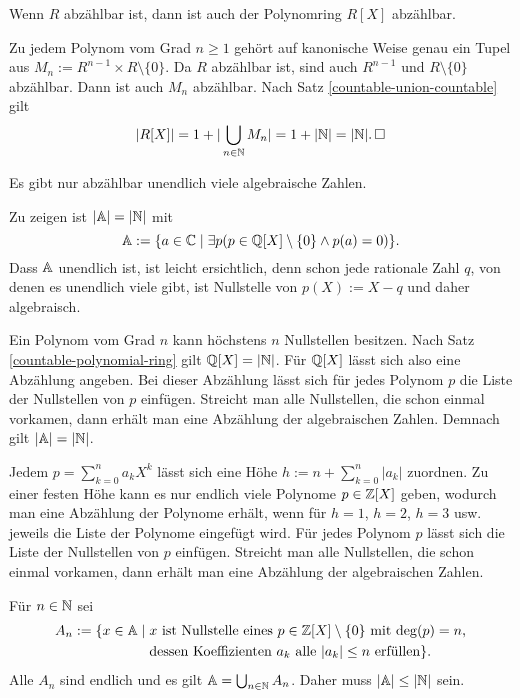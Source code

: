 \begin{Satz}\label{countable-polynomial-ring}
Wenn $R$ abzählbar ist, dann ist auch der Polynomring $R[X]$ abzählbar.
\end{Satz}

\begin{Beweis}
Zu jedem Polynom vom Grad $n\ge 1$ gehört auf kanonische Weise
genau ein Tupel aus $M_n:=R^{n-1}\times R\setminus\{0\}$. Da $R$
abzählbar ist, sind auch $R^{n-1}$ und $R\setminus\{0\}$ abzählbar.
Dann ist auch $M_n$ abzählbar. Nach Satz \ref{countable-union-countable}
gilt
\[|R[X]| = 1+|\bigcup_{n\in\mathbb N} M_n| = 1+|\mathbb N| = |\mathbb N|.\,\square\]
\end{Beweis}

\begin{Satz}
Es gibt nur abzählbar unendlich viele algebraische Zahlen.
\end{Satz}

\begin{Beweis}[Beweis 1]
Zu zeigen ist $|\mathbb A|=|\mathbb N|$ mit
\[\mathbb A := \{a\in\mathbb C\mid \exists p(p\in \mathbb Q[X]\setminus\{0\}\land p(a)=0)\}.\]
Dass $\mathbb A$ unendlich ist, ist leicht ersichtlich, denn schon jede
rationale Zahl $q$, von denen es unendlich viele gibt, ist Nullstelle
von $p(X):=X-q$ und daher algebraisch.

Ein Polynom vom Grad $n$ kann höchstens $n$ Nullstellen besitzen.
Nach Satz \ref{countable-polynomial-ring} gilt $\mathbb Q[X]=|\mathbb N|$.
Für $\mathbb Q[X]$ lässt sich also eine Abzählung angeben.
Bei dieser Abzählung lässt sich für jedes Polynom $p$ die Liste der
Nullstellen von $p$ einfügen. Streicht man alle Nullstellen, die schon
einmal vorkamen, dann erhält man eine Abzählung der algebraischen
Zahlen. Demnach gilt $|\mathbb A|=|\mathbb N|$.\,\qedsymbol
\end{Beweis}

\begin{Beweis}[Beweis 2]
Jedem $p=\sum_{k=0}^n a_kX^k$ lässt sich eine Höhe
$h:=n+\sum_{k=0}^n |a_k|$ zuordnen. Zu einer festen Höhe kann es nur
endlich viele Polynome $p\in\mathbb Z[X]$ geben, wodurch man eine Abzählung der
Polynome erhält, wenn für $h=1$, $h=2$, $h=3$ usw. jeweils die Liste
der Polynome eingefügt wird. Für jedes Polynom $p$ lässt sich die
Liste der Nullstellen von $p$ einfügen. Streicht man alle Nullstellen,
die schon einmal vorkamen, dann erhält man eine Abzählung der
algebraischen Zahlen.\,\qedsymbol
\end{Beweis}

\begin{Beweis}[Beweis 3]
Für $n\in\mathbb N$ sei
\[\begin{split}
A_n := \{x\in\mathbb A\mid \;&\text{$x$ ist Nullstelle eines
$p\in\mathbb Z[X]\setminus\{0\}$ mit $\deg(p)=n$,}\\
& \text{dessen Koeffizienten $a_k$ alle $|a_k|\le n$
erfüllen}\}.
\end{split}\]
Alle $A_n$ sind endlich und es gilt $\mathbb A=\bigcup_{n\in\mathbb N} A_n$.
Daher muss $|\mathbb A|\le |\mathbb N|$ sein.\,\qedsymbol
\end{Beweis}

